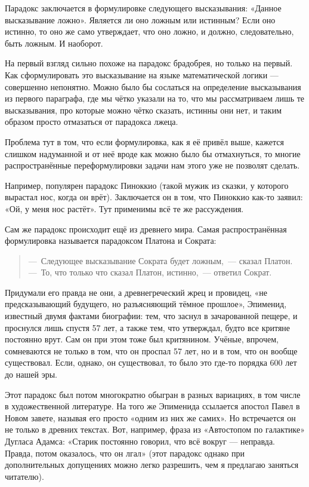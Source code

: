 Парадокс заключается в формулировке следующего высказывания: «Данное высказывание ложно». Является ли оно ложным или истинным? Если оно истинно, то оно же само утверждает, что оно ложно, и должно, следовательно, быть ложным. И нао\-бо\-рот.

На первый взгляд сильно похоже на парадокс брадобрея, но только на первый.  Как сформулировать это высказывание на языке математической логики — совершенно непонятно. Можно было бы сослаться на определение высказывания из первого параграфа, где мы чётко указали на то, что мы рассматриваем лишь те высказывания, про которые можно чётко сказать, истинны они нет, и таким образом просто отмазаться от парадокса лжеца.

Проблема тут в том, что если формулировка, как я её привёл выше, кажется слишком надуманной и от неё вроде как можно было бы отмахнуться, то многие распространённые переформулировки задачи нам этого уже не позволят сделать.

Например, популярен парадокс Пиноккио (такой мужик из сказки, у которого вырастал нос, когда он врёт). Заключается он в том, что Пиноккио как-то заявил: «Ой, у меня нос растёт». Тут применимы всё те же рассуждения.

Сам же парадокс происходит ещё из древнего мира. Самая распространённая формулировка называется парадоксом Платона и Сократа:

\begin{quote}
---~Следующее высказывание Сократа будет ложным,~--- сказал Платон.\\
---~То, что только что сказал Платон, истинно,~--- ответил Сократ.
\end{quote}

Придумали его правда не они, а древнегреческий жрец и провидец, «не предсказывающий будущего, но разъясняющий тёмное прошлое», Эпименид, известный двумя фактами биографии: тем, что заснул в зачарованной пещере, и проснулся лишь спустя 57 лет, а также тем, что утверждал, будто все критяне постоянно врут. Сам он при этом тоже был критянином. Учёные, впрочем, сомневаются не только в том, что он проспал 57 лет, но и в том, что он вообще существовал. Если, однако, он существовал, то было это где-то порядка 600 лет до нашей эры.

Этот парадокс был потом многократно обыгран в разных вариациях, в том числе в художественной литературе. На того же Эпименида ссылается апостол Павел в Новом завете, называя его просто «одним из них же самих». Но встречается он не только в древних текстах. Вот, например, фраза из «Автостопом по галактике» Дугласа Адамса: «Старик постоянно говорил, что всё вокруг — неправда. Правда, потом оказалось, что он лгал» (этот парадокс однако при дополнительных допущениях можно легко разрешить, чем я предлагаю заняться читателю).

